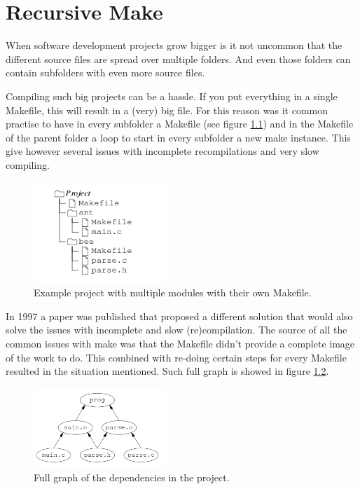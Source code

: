 \chapter{Recursive Make}
\label{chap:rMake}

When software development projects grow bigger is it not uncommon that the different source files are spread over multiple folders. And even those folders can contain subfolders with even more source files.

Compiling such big projects can be a hassle. If you put everything in a single Makefile, this will result in a (very) big file. For this reason was it common practise to have in every subfolder a Makefile (see figure \ref{fig:recmake_project}) and in the Makefile of the parent folder a loop to start in every subfolder a new make instance. This give however several issues with incomplete recompilations and very slow compiling.

 \begin{figure}[H]
  \centering
  \includegraphics[width=5cm]{Images/recmake-project.png}
  \caption{ Example project with multiple modules with their own Makefile. \cite{recmake}}
  \label{fig:recmake_project}
\end{figure}

In 1997 a paper \cite{recmake} was published that proposed a different solution that would also solve the issues with incomplete and slow (re)compilation. The source of all the common issues with make was that the Makefile didn't provide a complete image of the work to do. This combined with re-doing certain steps for every Makefile resulted in the situation mentioned. Such full graph is showed in figure \ref{fig:recmake_fullgraph}.

\begin{figure}[H]
  \centering
  \includegraphics[width=5cm]{Images/makerec-fulll-graph.png}
  \caption{ Full graph of the dependencies in the project. \cite{recmake}}
  \label{fig:recmake_fullgraph}
\end{figure}

